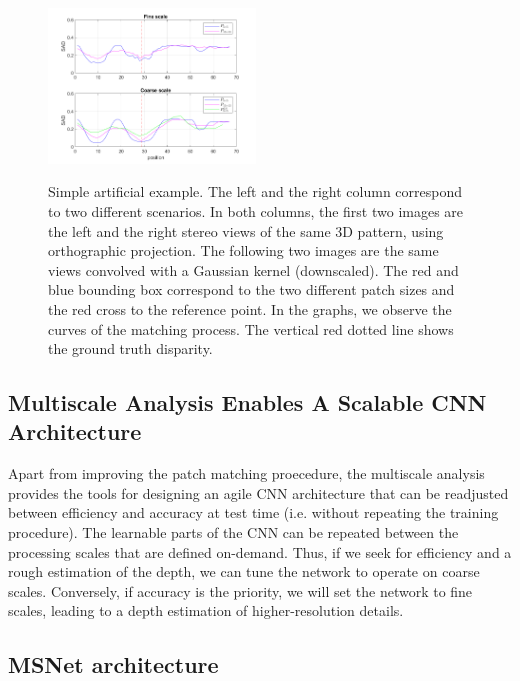 \documentclass[runningheads]{llncs}
\begin{document}
\begin{figure}[!t]
\begin{center}
        \includegraphics[width=0.49\textwidth]{paper/latex/figures/low_resolution_success_graph.png}\\
        
    \end{center}
    
    \caption{Simple artificial example. The left and the right column correspond to two different scenarios. In both columns, the first two images are the left and the right stereo views of the same 3D pattern, using orthographic projection. The following two images are the same views convolved with a Gaussian kernel (downscaled). The red and blue bounding box correspond to the two different patch sizes and the red cross to the reference point. In the graphs, we observe the curves of the matching process. The vertical red dotted line shows the ground truth disparity.}
    \label{fig:multiscale_importance_2D}
\end{figure}

\subsection{Multiscale Analysis Enables A Scalable CNN Architecture}

Apart from improving the patch matching proecedure, the multiscale analysis provides the tools for designing an agile CNN architecture that can be readjusted between efficiency and accuracy at test time (i.e. without repeating the training procedure). The learnable parts of the CNN can be repeated between the processing scales that are defined on-demand. Thus, if we seek for efficiency and a rough estimation of the depth, we can tune the network to operate on coarse scales. Conversely, if accuracy is the priority, we will set the network to fine scales, leading to a depth estimation of higher-resolution details.

\subsection{MSNet architecture}
\end{document}
